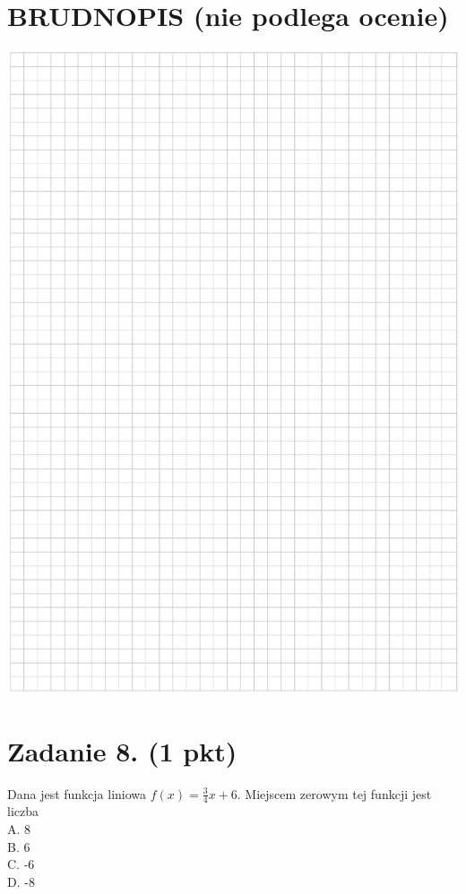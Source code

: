 \documentclass[10pt]{article}
\begin{document}
\section*{BRUDNOPIS (nie podlega ocenie)}
\begin{center}
\includegraphics[max width=\textwidth]{2024_11_21_779b7f825da3a12753feg-03}
\end{center}

\section*{Zadanie 8. (1 pkt)}
Dana jest funkcja liniowa \(f(x)=\frac{3}{4} x+6\). Miejscem zerowym tej funkcji jest liczba\\
A. 8\\
B. 6\\
C. -6\\
D. -8
\end{document}
